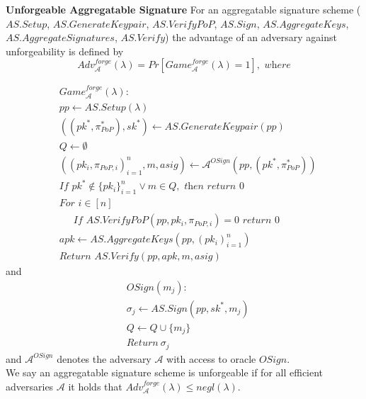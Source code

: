 \noindent \textbf{Unforgeable Aggregatable Signature}
For an aggregatable signature scheme ($\mathit{AS.Setup}$, $\mathit{AS.GenerateKeypair}$, $\mathit{AS.VerifyPoP}$, $\mathit{AS.Sign}$,
$\mathit{AS.AggregateKeys}$, $\mathit{AS.AggregateSignatures}$, $\mathit{AS.Verify}$)
the advantage of an adversary against unforgeability is defined by
$$\mathit{Adv}^{\mathit{forge}}_{\mathcal{A}}({\lambda}) = \mathit{Pr}[\mathit{Game}^{\mathit{forge}}_{\mathcal{A}}({\lambda}) =1], \textit{\ where}$$

\begin{align*}
&\mathit{Game}^{\mathit{forge}}_{\mathcal{A}}({\lambda}): \\
& \mathit{pp} \leftarrow \mathit{AS.Setup(\lambda)} \\
& ((\mathit{pk}^*,\pi^*_{\mathit{PoP}}), \mathit{sk}^*) \leftarrow \mathit{AS.GenerateKeypair}(\mathit{pp})\\
& Q \leftarrow \emptyset \\
& ((\mathit{pk_i}, \pi_{\mathit{PoP},i})_{i=1}^{n}, m, \mathit{asig}) \leftarrow \mathcal{A}^{\mathit{OSign}}(\mathit{pp}, (\mathit{pk^*},\pi^*_{\mathit{PoP}})) \\
& \textit{If } \mathit{pk}^* \notin \{\mathit{pk_i}\}_{i=1}^{n} \vee m \in Q, \textit{ then return } 0 \\
& \textit{For } i \in [n] \\
& \ \ \ \ \ \textit{ If } \mathit{AS.VerifyPoP}(\mathit{pp}, \mathit{pk_i}, \pi_{\mathit{PoP},i})=0  \textit{ return } 0 \\
& \mathit{apk} \leftarrow \mathit{AS.AggregateKeys}(\mathit{pp}, (\mathit{pk_i})_{i=1}^{n}) \\
& \textit{Return } \mathit{AS.Verify}(\mathit{pp}, \mathit{apk}, m, \mathit{asig})
\end{align*}
\noindent and
\begin{align*}
& \mathit{OSign}(m_j): \\
& \sigma_j \leftarrow \mathit{AS.Sign}(\mathit{pp}, \mathit{sk}^*, m_j) \\
&  Q \leftarrow Q \cup \{m_j\} \\
& \textit{Return} \ \sigma_j
\end{align*}
\noindent and $\mathcal{A}^{\mathit{OSign}}$ denotes the adversary $\mathcal{A}$ with access to oracle $\mathit{OSign}$. \\
\noindent We say an aggregatable signature scheme is unforgeable if for all efficient adversaries
$\mathcal{A}$ it holds that $\mathit{Adv}^{\mathit{forge}}_{\mathcal{A}}({\lambda}) \leq \mathit{negl}(\lambda)$. 

